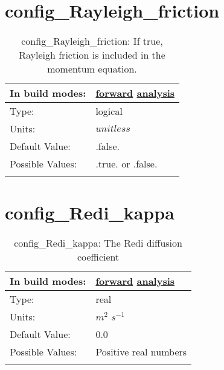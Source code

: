 \section[config\_Rayleigh\_friction]{config\_Rayleigh\_friction}
\label{sec:nm_sec_config_Rayleigh_friction}
\begin{center}
\begin{longtable}{| p{2.0in} || p{4.0in} |}
    \hline
    In build modes: & \hyperref[subsec:forward_nm_tab_Rayleigh_damping]{forward} \hyperref[subsec:analysis_nm_tab_Rayleigh_damping]{analysis} \\
    \hline
    Type: & logical \\
    \hline
    Units: & $unitless$ \\
    \hline
    Default Value: & .false. \\
    \hline
    Possible Values: & .true. or .false. \\
    \hline
    \caption{config\_Rayleigh\_friction: If true, Rayleigh friction is included in the momentum equation.}
\end{longtable}
\end{center}
\section[config\_Redi\_kappa]{config\_Redi\_kappa}
\label{sec:nm_sec_config_Redi_kappa}
\begin{center}
\begin{longtable}{| p{2.0in} || p{4.0in} |}
    \hline
    In build modes: & \hyperref[subsec:forward_nm_tab_mesoscale_eddy_parameterization]{forward} \hyperref[subsec:analysis_nm_tab_mesoscale_eddy_parameterization]{analysis} \\
    \hline
    Type: & real \\
    \hline
    Units: & $m^2$ $s^{-1}$ \\
    \hline
    Default Value: & 0.0 \\
    \hline
    Possible Values: & Positive real numbers \\
    \hline
    \caption{config\_Redi\_kappa: The Redi diffusion coefficient}
\end{longtable}
\end{center}
